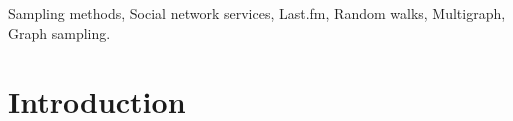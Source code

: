 \documentclass[10pt, conference]{./IEEEtran}
\newcommand{\ie}{{\em i.e., }}
\newcommand{\eg}{{\em e.g., }}
\newcommand{\lastfm}{{\tt Last.fm}\xspace}
\begin{document}
\begin{keywords}
Sampling methods, Social network services, Last.fm, Random walks, Multigraph, Graph sampling.
\end{keywords} 

\section{Introduction}
\end{document}
